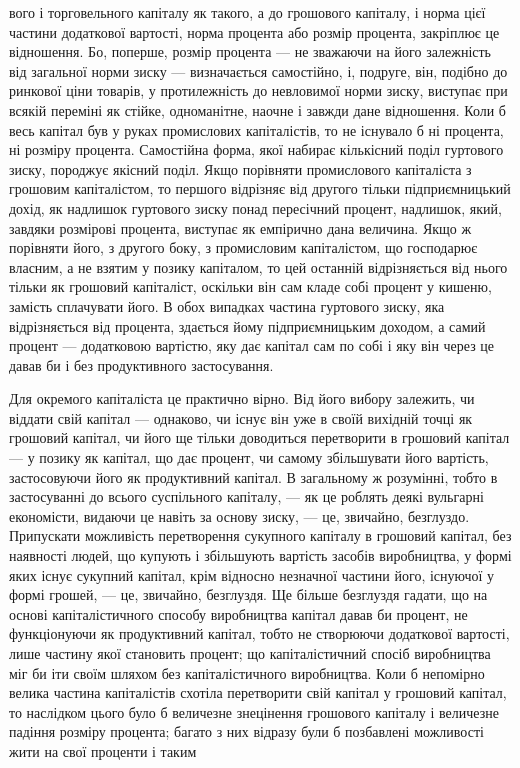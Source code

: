 вого і торговельного капіталу як такого, а до грошового
капіталу, і норма цієї частини додаткової вартості, норма процента
або розмір процента, закріплює це відношення. Бо, поперше,
розмір процента — не зважаючи на його залежність
від загальної норми зиску — визначається самостійно, і, подруге,
він, подібно до ринкової ціни товарів, у протилежність до невловимої
норми зиску, виступає при всякій переміні як стійке,
одноманітне, наочне і завжди дане відношення. Коли б весь
капітал був у руках промислових капіталістів, то не існувало
б ні процента, ні розміру процента. Самостійна форма,
якої набирає кількісний поділ гуртового зиску, породжує якісний
поділ. Якщо порівняти промислового капіталіста з грошовим
капіталістом, то першого відрізняє від другого тільки підприємницький
дохід, як надлишок гуртового зиску понад
пересічний процент, надлишок, який, завдяки розмірові процента,
виступає як емпірично дана величина. Якщо ж порівняти
його, з другого боку, з промисловим капіталістом, що
господарює власним, а не взятим у позику капіталом, то цей
останній відрізняється від нього тільки як грошовий капіталіст,
оскільки він сам кладе собі процент у кишеню, замість
сплачувати його. В обох випадках частина гуртового зиску, яка
відрізняється від процента, здається йому підприємницьким доходом,
а самий процент — додатковою вартістю, яку дає капітал
сам по собі і яку він через це давав би і без продуктивного
застосування.

Для окремого капіталіста це практично вірно. Від його вибору
залежить, чи віддати свій капітал — однаково, чи існує
він уже в своїй вихідній точці як грошовий капітал, чи його
ще тільки доводиться перетворити в грошовий капітал — у позику
як капітал, що дає процент, чи самому збільшувати його
вартість, застосовуючи його як продуктивний капітал. В загальному
ж розумінні, тобто в застосуванні до всього суспільного
капіталу, — як це роблять деякі вульгарні економісти, видаючи
це навіть за основу зиску, — це, звичайно, безглуздо. Припускати
можливість перетворення сукупного капіталу в грошовий капітал,
без наявності людей, що купують і збільшують вартість
засобів виробництва, у формі яких існує сукупний капітал, крім
відносно незначної частини його, існуючої у формі грошей, — це,
звичайно, безглуздя. Ще більше безглуздя гадати, що на основі
капіталістичного способу виробництва капітал давав би процент,
не функціонуючи як продуктивний капітал, тобто не створюючи
додаткової вартості, лише частину якої становить процент; що
капіталістичний спосіб виробництва міг би іти своїм шляхом без
капіталістичного виробництва. Коли б непомірно велика частина
капіталістів схотіла перетворити свій капітал у грошовий капітал,
то наслідком цього було б величезне знецінення грошового капіталу
і величезне падіння розміру процента; багато з них відразу
були б позбавлені можливості жити на свої проценти і таким

